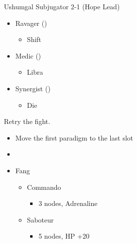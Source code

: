 \renewcommand{\first}{[1] Ravager (\rav)}
\renewcommand{\second}{[2] Medic (\med)}
\renewcommand{\third}{[3] Synergist (\syn)}
\newpage
\begin{multicols}{2}
\begin{battle}{Ushumgal Subjugator 2-1 (Hope Lead)}
\begin{itemize}
    \item \first
    \begin{itemize}
    \item Shift
    \end{itemize}
    \item \second
    \begin{itemize}
        \item Libra
    \end{itemize}
    \item \third
    \begin{itemize}
        \item Die
    \end{itemize}
\end{itemize}
\end{battle}
Retry the fight.
\begin{menu}
\begin{itemize}
    \paradigm
    \begin{itemize}
        \item Move the first paradigm to the last slot
        \item {}%
{\paradigmline{[\com]}{\com}{\rav}}
{\paradigmline{\com}{\rav}{(\rav)}}%
{\paradigmline[3]{\textit{(\sab)}}{\textit{(\rav)}}{\textit{\rav}}}%
{\paradigmline{\sen}{(\rav)}{(\rav)}}%
{\paradigmline{\sab}{(\rav)}{\syn}}%
{\paradigmline{\com}{\rav}{\rav}}
    \end{itemize}
    \crystarium
    \begin{itemize}
        \item Fang
        \begin{itemize}
            \item Commando
            \begin{itemize}
                \item 3 nodes, Adrenaline
            \end{itemize}
            \item Saboteur
            \begin{itemize}
                \item 5 nodes, HP +20
            \end{itemize}

\end{itemize}
\end{itemize}
\end{itemize}
\end{menu}
\end{multicols}
